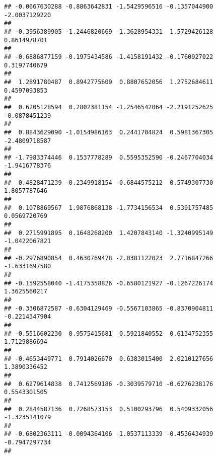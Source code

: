 \documentclass[]{article}
\begin{document}
\begin{verbatim}
## -0.0667630288 -0.8863642831 -1.5429596516 -0.1357044900 -2.0037129220 
##                                                                       
## -0.3956389905 -1.2446820669 -1.3628954331  1.5729426128  0.8614978701 
##                                                                       
## -0.6886877159 -0.1975434586 -1.4158191432 -0.1760927022  0.3197740679 
##                                                                       
##  1.2891780487  0.8942775609  0.8807652056  1.2752684611  0.4597093853 
##                                                                       
##  0.6205128594  0.2802381154 -1.2546542064 -2.2191252625 -0.0878451239 
##                                                                       
##  0.8843629090 -1.0154986163  0.2441704824  0.5981367305 -2.4809718587 
##                                                                       
## -1.7983374446  0.1537778289  0.5595352590 -0.2467704034 -1.9416778376 
##                                                                       
##  0.4828471239 -0.2349918154 -0.6844575212  0.5749307730  1.8057787646 
##                                                                       
##  0.1078869567  1.9876868138 -1.7734156534  0.5391757485  0.0569720769 
##                                                                       
##  0.2715991895  0.1648268200  1.4207843140 -1.3240995149 -1.0422067821 
##                                                                       
## -0.2976890854  0.4630769478 -2.0381122023  2.7716847266 -1.6331697580 
##                                                                       
## -0.1592558040 -1.4175358826 -0.6580121927 -0.1267226174  1.3625560217 
##                                                                       
## -0.3306872587 -0.6304129469 -0.5567103865 -0.8370904811 -0.2214347904 
##                                                                       
## -0.5516602230  0.9575415681  0.5921840552  0.6134752355  1.7129886694 
##                                                                       
## -0.4653449771  0.7914026670  0.6383015400  2.0210127656  1.3890336452 
##                                                                       
##  0.6279614838  0.7412569186 -0.3039579710 -0.6276238176  0.5543301505 
##                                                                       
##  0.2844587136  0.7268573153  0.5100293796  0.5409332056 -1.3235141079 
##                                                                       
## -0.6802363111 -0.0094364106 -1.0537113339 -0.4536434939 -0.7947297734 
##                                                                       

\end{verbatim}
\end{document}

